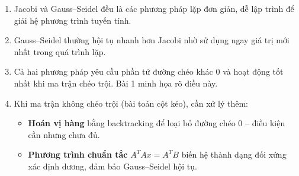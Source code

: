 \documentclass[12pt,a4paper]{article}
\begin{document}
\begin{enumerate}
    \item Jacobi và Gauss--Seidel đều là các phương pháp lặp đơn giản, dễ lập trình để giải hệ phương trình tuyến tính.
    \item Gauss--Seidel thường hội tụ nhanh hơn Jacobi nhờ sử dụng ngay giá trị mới nhất trong quá trình lặp.
    \item Cả hai phương pháp yêu cầu phần tử đường chéo khác 0 và hoạt động tốt nhất khi ma trận chéo trội. Bài 1 minh họa rõ điều này.
    \item Khi ma trận không chéo trội (bài toán cột kéo), cần xử lý thêm:
    \begin{itemize}
        \item \textbf{Hoán vị hàng} bằng backtracking để loại bỏ đường chéo 0 -- điều kiện cần nhưng chưa đủ.
        \item \textbf{Phương trình chuẩn tắc} $A^TAx = A^TB$ biến hệ thành dạng đối xứng xác định dương, đảm bảo Gauss--Seidel hội tụ.
    \end{itemize}
\end{enumerate}
\end{document}
